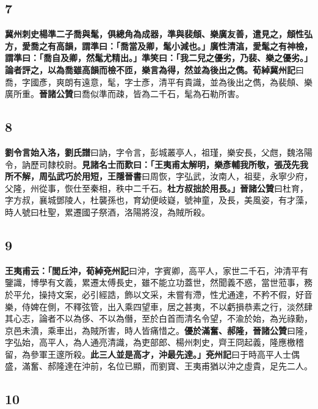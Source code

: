 \subsection*{7}

\textbf{冀州刺史楊準二子喬與髦，俱總角為成器，準與裴頠、樂廣友善，遣見之，頠性弘方，愛喬之有高韻，謂準曰：「喬當及卿，髦小減也。」廣性清湻，愛髦之有神檢，謂準曰：「喬自及卿，然髦尤精出。」準笑曰：「我二兒之優劣，乃裴、樂之優劣。」論者評之，以為喬雖高韻而檢不匝，樂言為得，然並為後出之儁。}{\footnotesize \textbf{荀綽冀州記}曰喬，字國彥，爽朗有遠意，髦，字士彥，清平有貴識，並為後出之儁，為裴頠、樂廣所重。\textbf{晉諸公贊}曰喬似準而疎，皆為二千石，髦為石勒所害。}

\subsection*{8}

\textbf{劉令言始入洛，}{\footnotesize \textbf{劉氏譜}曰訥，字令言，彭城叢亭人，祖瑾，樂安長，父甝，魏洛陽令，訥歷司隸校尉。}\textbf{見諸名士而歎曰：「王夷甫太解明，樂彥輔我所敬，張茂先我所不解，周弘武巧於用短，}{\footnotesize \textbf{王隱晉書}曰周恢，字弘武，汝南人，祖斐，永寧少府，父隆，州從事，恢仕至秦相，秩中二千石。}\textbf{杜方叔拙於用長。」}{\footnotesize \textbf{晉諸公贊}曰杜育，字方叔，襄城鄧陵人，杜襲孫也，育幼便岐嶷，號神童，及長，美風姿，有才藻，時人號曰杜聖，累遷國子祭酒，洛陽將沒，為賊所殺。}

\subsection*{9}

\textbf{王夷甫云：「閭丘沖，}{\footnotesize \textbf{荀綽兗州記}曰沖，字賓卿，高平人，家世二千石，沖清平有鑒識，博學有文義，累遷太傅長史，雖不能立功蓋世，然聞義不惑，當世蒞事，務於平允，操持文案，必引經誥，飾以文采，未嘗有滯，性尤通達，不矜不假，好音樂，侍婢在側，不釋弦管，出入乘四望車，居之甚夷，不以虧損恭素之行，淡然肆其心志，論者不以為侈、不以為僭，至於白首而清名令望，不渝於始，為光祿勳，京邑未潰，乘車出，為賊所害，時人皆痛惜之。}\textbf{優於滿奮、郝隆，}{\footnotesize \textbf{晉諸公贊}曰隆，字弘始，高平人，為人通亮清識，為吏部郎、楊州刺史，齊王冏起義，隆應檄稽留，為參軍王邃所殺。}\textbf{此三人並是高才，沖最先達。」}{\footnotesize \textbf{兗州記}曰于時高平人士偶盛，滿奮、郝隆達在沖前，名位已顯，而劉寶、王夷甫猶以沖之虛貴，足先二人。}

\subsection*{10}


